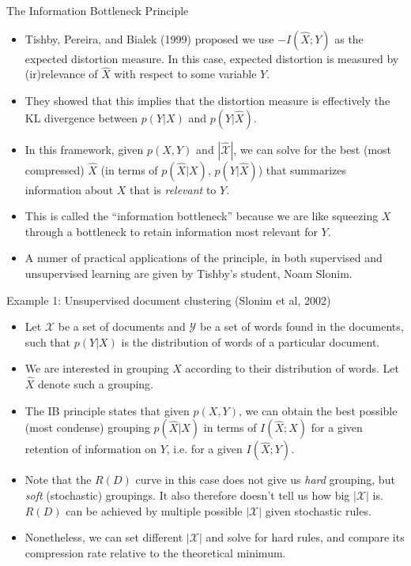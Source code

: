 \documentclass{beamer}
\begin{document}
\begin{frame}{The Information Bottleneck Principle}
\begin{itemize}
	\item Tishby, Pereira, and Bialek (1999) proposed we use $-I(\hat{X}; Y)$ as the expected distortion measure. In this case, expected distortion is measured by (ir)relevance of $\hat{X}$ with respect to some variable $Y$. 
	\item They showed that this implies that the distortion measure is effectively the KL divergence between $p(Y|X)$ and $p(Y|\hat{X})$. 
	\item In this framework, given $p(X,Y)$ and $|\hat{\mathcal{X}}|$, we can solve for the best (most compressed) $\hat{X}$ (in terms of $p(\hat{X}|X)$, $p(Y|\hat{X})$) that summarizes information about $X$ that is \emph{relevant} to $Y$. 
	\item This is called the ``information bottleneck'' because we are like squeezing $X$ through a bottleneck to retain information most relevant for $Y$. 
	\item A numer of practical applications of the principle, in both supervised and unsupervised learning are given by Tishby's student, Noam Slonim. 
\end{itemize}
\end{frame}

\begin{frame}{Example 1: Unsupervised document clustering (Slonim et al, 2002)}
\begin{itemize}
	\item Let $\mathcal{X}$ be a set of documents and $\mathcal{Y}$ be a set of words found in the documents, such that $p(Y|X)$ is the distribution of words of a particular document. 
	\item We are interested in grouping $X$ according to their distribution of words. Let $\hat{X}$ denote such a grouping.
	\item The IB principle states that given $p(X,Y)$, we can obtain the best possible (most condense) grouping $p(\hat{X}|X)$ in terms of $I(\hat{X};X)$ for a given retention of information on $Y$, i.e. for a given $I(\hat{X};Y)$. 
	\item Note that the $R(D)$ curve in this case does not give us \emph{hard} grouping, but \emph{soft} (stochastic) groupings. It also therefore doesn't tell us how big $|\mathcal{X}|$ is. $R(D)$ can be achieved by multiple possible $|\mathcal{X}|$ given stochastic rules. 
	\item Nonetheless, we can set different $|\mathcal{X}|$ and solve for hard rules, and compare its compression rate relative to the theoretical minimum. 
\end{itemize}
\end{frame}
\end{document}

